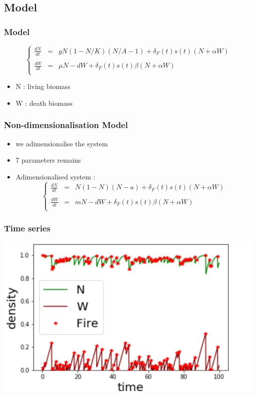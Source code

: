 \documentclass{beamer}
\begin{document}
\subsection{Model}
\begin{frame}
\frametitle{Model}
\[
\left\{
\begin{array}{rcl}
\frac{dN}{dt} & = & gN(1-N/K)(N/A-1) + \delta_F(t)s(t)(N+\alpha W)\\
\\
\frac{dW}{dt} & = & \mu N-dW  + \delta_F(t)s(t)\beta(N+\alpha W)\\
\end{array}
\right.
\]
\begin{itemize}
    \item N : living biomass
    \item W : death biomass
\end{itemize}
\end{frame}


\begin{frame}
\frametitle{Non-dimensionalisation Model}
\begin{itemize}
    \item we adimensionalise the system
    \item 7 parameters remains
    \item Adimensionalised system : 
    \[
\left\{
\begin{array}{rcl}
\frac{dN}{dt} & = & N(1-N)(N-a) + \delta_F(t)s(t)(N+\alpha W)\\
\\
\frac{dW}{dt} & = & mN-dW  + \delta_F(t)s(t)\beta(N+\alpha W)\\
\end{array}
\right.
\]

\end{itemize}
\end{frame}


\begin{frame}
\frametitle{Time series}
\includegraphics[width=10.cm]{time_series.png}
\end{frame}
\end{document}
